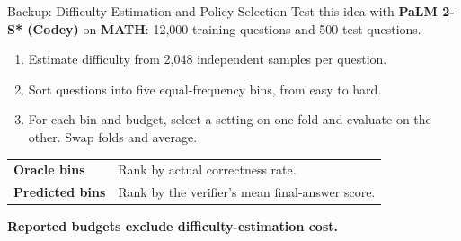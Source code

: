 \documentclass[aspectratio=1610,xcolor=dvipsnames,t]{beamer}
\newcommand{\keyterm}[1]{\textcolor{unirot}{\textbf{#1}}}
\begin{document}
\begin{frame}{Backup: Difficulty Estimation and Policy Selection}
  Test this idea with \textbf{PaLM 2-S* (Codey)} on \textbf{MATH}: 12,000 training questions and 500 test questions.
  \par\medskip
  \begin{enumerate}
    \item Estimate difficulty from 2,048 independent samples per question.
    \item Sort questions into five equal-frequency bins, from easy to hard.
    \item For each bin and budget, select a setting on one fold and evaluate on the other. Swap folds and average.
  \end{enumerate}
  \par\smallskip
  \begin{tabular}{@{}ll@{}}
    \textbf{Oracle bins} & Rank by actual correctness rate.\\
    \textbf{Predicted bins} & Rank by the verifier's mean final-answer score.
  \end{tabular}
  \par\medskip
  \keyterm{Reported budgets exclude difficulty-estimation cost.}
\end{frame}
\end{document}
